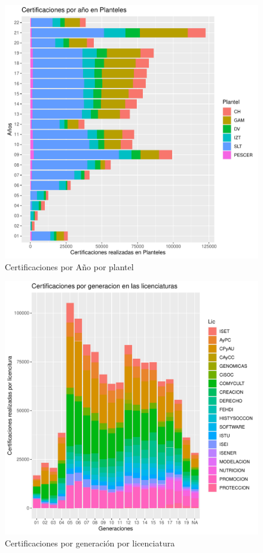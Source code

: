 \documentclass[12pt]{article}
\begin{document}
\begin{figure}
\centering
\includegraphics[scale=0.45]{Graficas/ggplotBarplotAnhoPlantel3.pdf}
\caption{Certificaciones por A\~no por plantel}
\label{Fig.Cert.Anho-Plantel3}
\end{figure}
\begin{figure}
\centering
\includegraphics[scale=0.45]{Graficas/ggplotBarplotGenLic.pdf}
\caption{Certificaciones por generaci\'on por licenciatura}
\label{Fig.Cert.Gen-Lic}
\end{figure}
\end{document}
